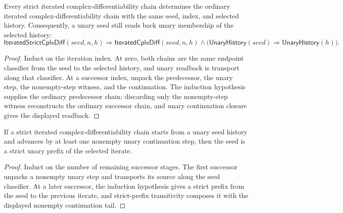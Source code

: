 \begin{theorem}
\label{thm:iterated-strict-cplxdiff-relaxation}
Every strict iterated complex-differentiability chain determines the ordinary
iterated complex-differentiability chain with the same seed, index, and
selected history. Consequently, a unary seed still reads back unary membership
of the selected history:
$$
\mathsf{IteratedStrictCplxDiff}(seed,n,h)
\Longrightarrow
\mathsf{IteratedCplxDiff}(seed,n,h)\wedge
\bigl(\mathsf{UnaryHistory}(seed)\Rightarrow\mathsf{UnaryHistory}(h)\bigr).
$$
\end{theorem}
\begin{proof}
Induct on the iteration index. At zero, both chains are the same endpoint
classifier from the seed to the selected history, and unary readback is
transport along that classifier. At a successor index, unpack the predecessor,
the unary step, the nonempty-step witness, and the continuation. The induction
hypothesis supplies the ordinary predecessor chain; discarding only the
nonempty-step witness reconstructs the ordinary successor chain, and unary
continuation closure gives the displayed readback.
\end{proof}

\begin{lemma}
\label{lem:iterated-strict-cplx-diff-strict-prefix}
If a strict iterated complex-differentiability chain starts from a unary seed
history and advances by at least one nonempty unary continuation step, then the
seed is a strict unary prefix of the selected iterate.
\end{lemma}
\begin{proof}
Induct on the number of remaining successor stages. The first successor
unpacks a nonempty unary step and transports its source along the seed
classifier. At a later successor, the induction hypothesis gives a strict
prefix from the seed to the previous iterate, and strict-prefix transitivity
composes it with the displayed nonempty continuation tail.
\end{proof}

